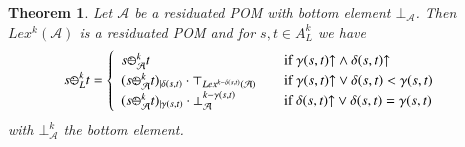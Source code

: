 \documentclass[a4paper]{elsarticle}
\newtheorem{theorem}{Theorem}
\newcommand{\1}{\mathbf{1}}
\def\odiv{{ \ominus\hspace{-8pt}:}\;}
\begin{document}
\begin{theorem}\label{prop:lexiRes}
	Let $\mathcal{A}$ be a residuated POM with bottom
	element $\bot_\mathcal{A}$.
	Then $Lex^k(\mathcal{A})$ is a residuated POM and for
	$s , t \in A^k_L$ we have
	\[
	s \odiv^k_L t = 	\begin{cases}
	\begin{array}{lcl}
	s \odiv^k_\mathcal{A} t & & \mbox{if  } \gamma(s,t){\uparrow} \wedge \delta(s,t){\uparrow} \\
	(s \odiv^k_\mathcal{A} t)_{\mid \delta(s,t)} \cdot \top_{Lex^{k-\delta(s,t)}(\mathcal{A})} & &  \mbox{if  } \gamma(s,t){\uparrow} \vee \delta(s,t) < \gamma(s,t) \\
	(s \odiv^k_\mathcal{A} t)_{\mid \gamma(s,t)} \cdot \bot^{k - \gamma(s, t)}_\mathcal{A} & & \mbox{if  } \delta(s,t){\uparrow} \vee \delta(s,t) = \gamma(s,t)
	\end{array}
	\end{cases}
	\]
with $\bot^k_\mathcal{A}$ the bottom element.
\end{theorem}
\end{document}
